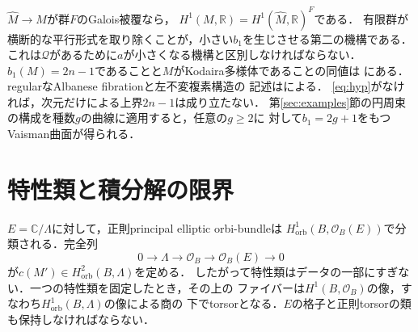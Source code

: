\documentclass[12pt]{amsart}
\theoremstyle{definition}
\theoremstyle{remark}
\numberwithin{equation}{section}
\newcommand{\cO}{\mathcal{O}}
\newcommand{\orb}{\mathrm{orb}}
\newcommand{\R}{\mathbb{R}}
\newcommand{\C}{\mathbb{C}}
\newcommand{\Qfac}{\mathcal{Q}}
\begin{document}
$\widehat M\to M$が群$F$のGalois被覆なら，
$H^1(M,\R)=H^1(\widehat M,\R)^F$である．
有限群が横断的な平行形式を取り除くことが，小さい$b_1$を生じさせる第二の機構である．
これは$\Qfac$があるために$a$が小さくなる機構と区別しなければならない．
$b_1(M)=2n-1$であることと$M$がKodaira多様体であることの同値は
\cite[Corollary 5.11]{Istrati}にある．regularなAlbanese fibrationと左不変複素構造の
記述は\cite[Theorems 1.1, 6.6]{Gomes}による．
\eqref{eq:hyp}がなければ，次元だけによる上界$2n-1$は成り立たない．
第\ref{sec:examples}節の円周束の構成を種数$g$の曲線に適用すると，任意の$g\geq2$に
対して$b_1=2g+1$をもつVaisman曲面が得られる．

\section{特性類と積分解の限界}\label{sec:twist}
$E=\C/\Lambda$に対して，正則principal elliptic orbi-bundleは
$H^1_{\orb}(B,\cO_B(E))$で分類される．完全列
\begin{equation}\label{eq:exp}
0\longrightarrow\Lambda\longrightarrow\cO_B\longrightarrow
\cO_B(E)\longrightarrow0
\end{equation}
が$c(M')\in H^2_{\orb}(B,\Lambda)$を定める．
したがって特性類はデータの一部にすぎない．一つの特性類を固定したとき，その上の
ファイバーは$H^1(B,\cO_B)$の像，すなわち$H^1_{\orb}(B,\Lambda)$の像による商の
下でtorsorとなる．$E$の格子と正則torsorの類も保持しなければならない．
\end{document}
